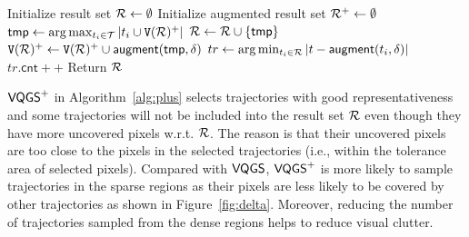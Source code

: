 %
\begin{algorithm}
    \caption{$\vatss(\D,k=\lceil \alpha \mathcal{T} \rceil,\delta)$} \label{alg:plus}
    \begin{algorithmic}[1]
    \State Initialize result set $\mathcal{R} \leftarrow \emptyset$
    \State Initialize augmented result set $\mathcal{R}^{+} \leftarrow \emptyset$
        \State $\mathsf{tmp} \leftarrow \arg\max_{t_i \in \mathcal{T}} | t_i  \cup \mathtt{V}(\mathcal{R})^{+} |$ \label{line:deltamax}
        \State $\mathcal{R} \leftarrow \mathcal{R} \cup \{ \mathsf{tmp} \}$
        \State $\mathtt{V}(\mathcal{R})^{+} \leftarrow \mathtt{V}(\mathcal{R})^{+} \cup \mathsf{augment}(\mathsf{tmp}, \delta)$\label{line:delta}
    \EndWhile
      \label{line:s}
        \State $tr \leftarrow \arg\min_{t_i \in \mathcal{R}}{|t-\mathsf{augment}(t_i, \delta)|}$
        \State $tr.\mathsf{cnt}++$ \label{line:e}
    \EndFor
    \State Return $\mathcal{R}$
    \end{algorithmic}
\end{algorithm}




$\mathsf{VQGS}^+$ in Algorithm~\ref{alg:plus} selects trajectories with good representativeness and some trajectories will not be included into the result set $\mathcal{R}$ even though they have more uncovered pixels w.r.t. $\mathcal{R}$.
The reason is that their uncovered pixels are too close to the pixels in the selected trajectories (i.e., within the tolerance area of selected pixels).
Compared with $\mathsf{VQGS}$, $\mathsf{VQGS}^+$ is more likely to sample trajectories in the sparse regions as their pixels are less likely to be covered by other trajectories as shown in Figure~\ref{fig:delta}.
Moreover, reducing the number of trajectories sampled from the dense regions helps to reduce visual clutter.



